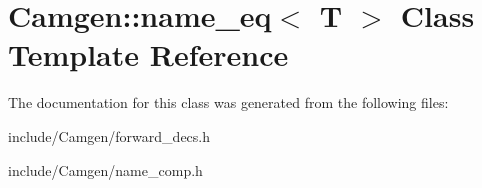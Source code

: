 \hypertarget{a00382}{}\section{Camgen\+:\+:name\+\_\+eq$<$ T $>$ Class Template Reference}
\label{a00382}


The documentation for this class was generated from the following files\+:\begin{DoxyCompactItemize}
\item 
include/\+Camgen/forward\+\_\+decs.\+h\item 
include/\+Camgen/name\+\_\+comp.\+h\end{DoxyCompactItemize}
